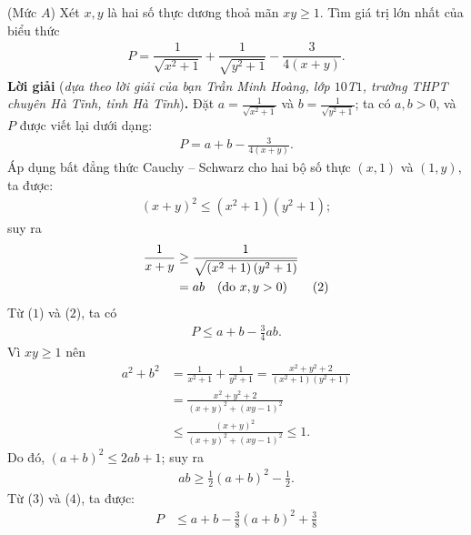 \begin{multicols}{2}
	{}
	(Mức $A$) Xét $x,y$ là hai số thực dương thoả mãn $xy\ge 1$. Tìm giá trị lớn nhất của biểu thức
	\begin{align*}
		P=\dfrac1{\sqrt{x^2+1}}+\dfrac1{\sqrt{y^2+1}}-\dfrac3{4(x+y)}.
	\end{align*}
	\textbf{\color{thachthuctoanhoc}Lời giải} (\textit{dựa theo lời giải của bạn Trần Minh Hoàng, lớp $10$T$1$, trường THPT chuyên Hà Tĩnh, tỉnh Hà Tĩnh})\textbf{\color{thachthuctoanhoc}.}
	\vskip 0.05cm
	Đặt $a = \frac{1}{{\sqrt {{x^2} + 1} }}$  và  $b = \frac{1}{{\sqrt {{y^2} + 1} }}$; ta có $a, b > 0$, và $P$ được viết lại dưới dạng:
	\begin{align*}
		P = a + b - \frac{3}{{4\left( {x + y} \right)}}. \tag{$1$}
	\end{align*}
	Áp dụng bất đẳng thức Cauchy -- Schwarz cho hai bộ số thực $(x, 1)$ và $(1, y)$, ta được:
	\begin{align*}
		{\left( {x + y} \right)^2} \le \left( {{x^2} + 1} \right)\left( {{y^2} + 1} \right);
	\end{align*}
	suy ra
	\begin{align*}
		\frac{1}{{x + y}} &\ge \frac{1}{{\sqrt {\left( {{x^2} + 1} \right)\left( {{y^2} + 1} \right)} }} \\
		&= ab \quad(\text{\color{black}do } x,y >0) \tag{$2$}
	\end{align*}
	Từ ($1$) và ($2$), ta có
	\begin{align*}
		P \le a + b - \frac{3}{4}ab. \tag{$3$}
	\end{align*}
	Vì $xy \ge 1$ nên
	\begin{align*}
		{a^2} \!+\! {b^2} &= \frac{1}{{{x^2} \!+\! 1}} \!+\! \frac{1}{{{y^2} \!+\! 1}} \!=\! \frac{{{x^2} \!+\! {y^2} \!+\! 2}}{{\left( {{x^2} \!+\! 1} \right)\!\left( {{y^2} \!+\! 1} \right)}} \\
		&= \frac{{{x^2} + {y^2} + 2}}{{{{\left( {x + y} \right)}^2} + {{\left( {xy - 1} \right)}^2}}} \\
		&\le \frac{{{{\left( {x + y} \right)}^2}}}{{{{\left( {x + y} \right)}^2} + {{\left( {xy - 1} \right)}^2}}} \le 1.
	\end{align*}
	Do đó, ${\left( {a + b} \right)^2} \le 2ab + 1$; suy ra
	\begin{align*}
		ab \ge \frac{1}{2}{\left( {a + b} \right)^2} - \frac{1}{2}.
	\end{align*}
	Từ ($3$) và ($4$), ta được:
	\begin{align*}
		P &\le a + b - \frac{3}{8}{\left( {a + b} \right)^2} + \frac{3}{8}\\

\end{align*}
\end{multicols}
